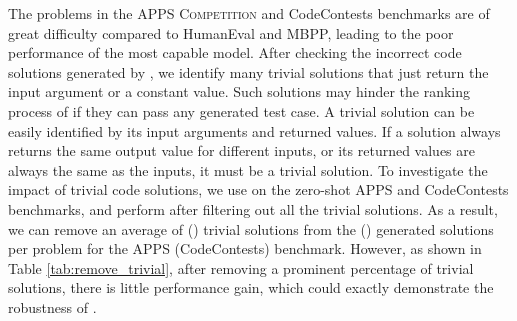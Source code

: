 \begin{table}[t]
    \centering
    \caption{Pass@ () results on the zero-shot APPS and CodeContests benchmarks using \davincitwo and \ours with/without the trivial code solutions filtered. The numbers in {\textcolor{red}{red}} indicate the absolute improvements after filtering the trivial solutions.}
    \label{tab:remove_trivial}
\end{table}

The problems in the APPS \textsc{Competition} and CodeContests benchmarks are of great difficulty compared to HumanEval and MBPP, leading to the poor performance of the most capable \davincitwo model. After checking the incorrect code solutions generated by \davincitwo, we identify many trivial solutions that just return the input argument or a constant value. Such solutions may hinder the ranking process of \ours if they can pass any generated test case. A trivial solution can be easily identified by its input arguments and returned values. If a solution always returns the same output value for different inputs, or its returned values are always the same as the inputs, it must be a trivial solution. To investigate the impact of trivial code solutions, we use \davincitwo on the zero-shot APPS and CodeContests benchmarks, and perform \ours after filtering out all the trivial solutions. 
As a result, we can remove an average of  () trivial solutions from the  () generated solutions per problem for the APPS (CodeContests) benchmark. However, as shown in Table \ref{tab:remove_trivial}, after removing a prominent percentage of trivial solutions, there is little performance gain, which could exactly demonstrate the robustness of \ours.


